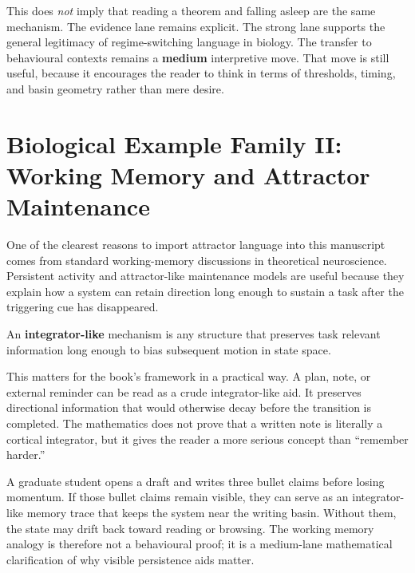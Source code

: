 This does \emph{not} imply that reading a theorem and falling asleep are the
same mechanism. The evidence lane remains explicit. The strong lane supports
the general legitimacy of regime-switching language in biology. The transfer to
behavioural contexts remains a \textbf{medium} interpretive move. That move is
still useful, because it encourages the reader to think in terms of thresholds,
timing, and basin geometry rather than mere desire.

\section{Biological Example Family II: Working Memory and Attractor Maintenance}

One of the clearest reasons to import attractor language into this manuscript
comes from standard working-memory discussions in theoretical neuroscience.
Persistent activity and attractor-like maintenance models are useful because
they explain how a system can retain direction long enough to sustain a task
after the triggering cue has disappeared.

\begin{definition}
An \textbf{integrator-like} mechanism is any structure that preserves task
relevant information long enough to bias subsequent motion in state space.
\end{definition}

\begin{discussion}
This matters for the book's framework in a practical way. A plan, note, or
external reminder can be read as a crude integrator-like aid. It preserves
directional information that would otherwise decay before the transition is
completed. The mathematics does not prove that a written note is literally a
cortical integrator, but it gives the reader a more serious concept than
``remember harder.''
\end{discussion}

\begin{example}
A graduate student opens a draft and writes three bullet claims before losing
momentum. If those bullet claims remain visible, they can serve as an
integrator-like memory trace that keeps the system near the writing basin.
Without them, the state may drift back toward reading or browsing. The working
memory analogy is therefore not a behavioural proof; it is a medium-lane
mathematical clarification of why visible persistence aids matter.
\end{example}

